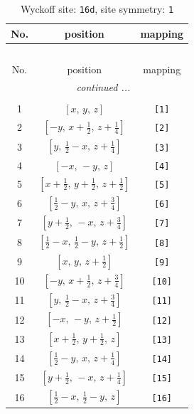 \documentclass[fleqn,8pt]{jsarticle}
\begin{document}
\begin{longtable}{ccc}
\caption{Wyckoff site: {\tt 16d}, site symmetry: {\tt 1}}
 \\
 \hline \hline
No. & position & mapping \\ \hline \endfirsthead

\multicolumn{2}{l}{\tablename\ \thetable{}} \\
 \hline \hline
No. & position & mapping \\ \hline \endhead

 \hline \hline
\multicolumn{2}{r}{\footnotesize\it continued ...} \\ \endfoot

 \hline \hline
\multicolumn{2}{r}{} \\ \endlastfoot

1 & $\left[ x,\, y,\, z \right]$ & {\tt [1]} \\ \hline
2 & $\left[ - y,\, x + \frac{1}{2},\, z + \frac{1}{4} \right]$ & {\tt [2]} \\ \hline
3 & $\left[ y,\, \frac{1}{2} - x,\, z + \frac{1}{4} \right]$ & {\tt [3]} \\ \hline
4 & $\left[ - x,\, - y,\, z \right]$ & {\tt [4]} \\ \hline
5 & $\left[ x + \frac{1}{2},\, y + \frac{1}{2},\, z + \frac{1}{2} \right]$ & {\tt [5]} \\ \hline
6 & $\left[ \frac{1}{2} - y,\, x,\, z + \frac{3}{4} \right]$ & {\tt [6]} \\ \hline
7 & $\left[ y + \frac{1}{2},\, - x,\, z + \frac{3}{4} \right]$ & {\tt [7]} \\ \hline
8 & $\left[ \frac{1}{2} - x,\, \frac{1}{2} - y,\, z + \frac{1}{2} \right]$ & {\tt [8]} \\ \hline
9 & $\left[ x,\, y,\, z + \frac{1}{2} \right]$ & {\tt [9]} \\ \hline
10 & $\left[ - y,\, x + \frac{1}{2},\, z + \frac{3}{4} \right]$ & {\tt [10]} \\ \hline
11 & $\left[ y,\, \frac{1}{2} - x,\, z + \frac{3}{4} \right]$ & {\tt [11]} \\ \hline
12 & $\left[ - x,\, - y,\, z + \frac{1}{2} \right]$ & {\tt [12]} \\ \hline
13 & $\left[ x + \frac{1}{2},\, y + \frac{1}{2},\, z \right]$ & {\tt [13]} \\ \hline
14 & $\left[ \frac{1}{2} - y,\, x,\, z + \frac{1}{4} \right]$ & {\tt [14]} \\ \hline
15 & $\left[ y + \frac{1}{2},\, - x,\, z + \frac{1}{4} \right]$ & {\tt [15]} \\ \hline
16 & $\left[ \frac{1}{2} - x,\, \frac{1}{2} - y,\, z \right]$ & {\tt [16]} \\
\end{longtable}
\end{document}
